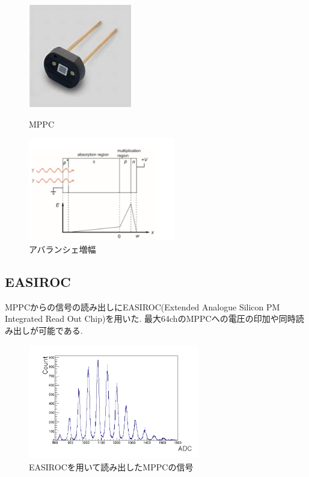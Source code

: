 \begin{figure}[H]
    \begin{minipage}[b]{0.47\linewidth}
        \centering
        \includegraphics[height=4.5cm]{img/1_mppc.jpg}
        \caption{MPPC}
        \label{fig:mppc}
    \end{minipage}
    \begin{minipage}[b]{0.47\linewidth}
        \centering
        \includegraphics[height=4.5cm]{img/avalanche.jpg}
        \caption{アバランシェ増幅}
        \label{fig:avalanche}
    \end{minipage}
\end{figure}

\subsection{EASIROC}
MPPCからの信号の読み出しにEASIROC(Extended Analogue Silicon PM Integrated Read Out Chip)を用いた.
最大64chのMPPCへの電圧の印加や同時読み出しが可能である.

\begin{figure}[H]
    \centering
    \includegraphics[height=5cm]{img/mppc_easiroc.jpg}
    \caption{EASIROCを用いて読み出したMPPCの信号}
    \label{fig:easiroc}
\end{figure}

